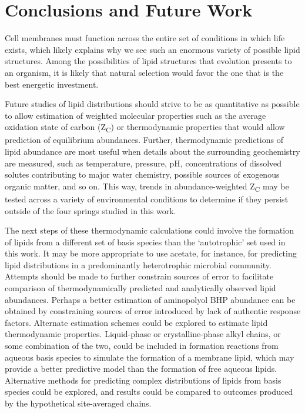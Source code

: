 \chapter{Conclusions and Future Work}

Cell membranes must function across the entire set of conditions in which life exists, which likely explains why we see such an enormous variety of possible lipid structures. Among the possibilities of lipid structures that evolution presents to an organism, it is likely that natural selection would favor the one that is the best energetic investment.

Future studies of lipid distributions should strive to be as quantitative as possible to allow estimation of weighted molecular properties such as the average oxidation state of carbon (Z\textsubscript{C}) or thermodynamic properties that would allow prediction of equilibrium abundances. Further, thermodynamic predictions of lipid abundance are most useful when details about the surrounding geochemistry are measured, such as temperature, pressure, pH, concentrations of dissolved solutes contributing to major water chemistry, possible sources of exogenous organic matter, and so on. This way, trends in abundance-weighted Z\textsubscript{C} may be tested across a variety of environmental conditions to determine if they persist outside of the four springs studied in this work.

The next steps of these thermodynamic calculations could involve the formation of lipids from a different set of basis species than the `autotrophic' set used in this work. It may be more appropriate to use acetate, for instance, for predicting lipid distributions in a predominantly heterotrophic microbial community. Attempts should be made to further constrain sources of error to facilitate comparison of thermodynamically predicted and analytically observed lipid abundances. Perhaps a better estimation of aminopolyol BHP abundance can be obtained by constraining sources of error introduced by lack of authentic response factors. Alternate estimation schemes could be explored to estimate lipid thermodynamic properties. Liquid-phase or crystalline-phase alkyl chains, or some combination of the two, could be included in formation reactions from aqueous basis species to simulate the formation of a membrane lipid, which may provide a better predictive model than the formation of free aqueous lipids. Alternative methods for predicting complex distributions of lipids from basis species could be explored, and results could be compared to outcomes produced by the hypothetical site-averaged chains.


